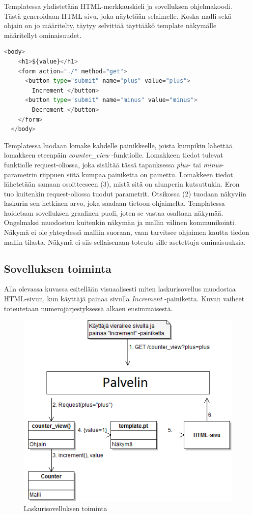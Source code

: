 \documentclass[finnish,utf8,nonumbib,palatino,kandi]{gradu2}
\begin{document}
Templatessa yhdistetään HTML-merkkauskieli ja sovelluksen ohjelmakoodi. Tästä generoidaan HTML-sivu, joka näytetään selaimelle. Koska malli sekä ohjain on jo määritelty, täytyy selvittää täyttääkö template näkymälle määritellyt ominaisuudet.
\begin{lstlisting}[language=Python]
  <body>
    <h1>${value}</h1>
    <form action="./" method="get">
      <button type="submit" name="plus" value="plus">
		Increment </button>
      <button type="submit" name="minus" value="minus"> 
		Decrement </button>
    </form>
  </body>
\end{lstlisting}
Templatessa luodaan lomake kahdelle painikkeelle, joista kumpikin lähettää lomakkeen eteenpäin \emph{counter\_view} -funktiolle. Lomakkeen tiedot tulevat funktiolle request-oliossa, joka sisältää tässä tapauksessa \emph{plus}- tai \emph{minus}-parametrin riippuen siitä kumpaa painiketta on painettu. Lomakkeen tiedot lähetetään samaan osoitteeseen (3), mistä sitä on alunperin kutsuttukin. Eron tuo kuitenkin request-oliossa tuodut parametrit.  Otsikossa (2) tuodaan näkyviin laskurin sen hetkinen arvo, joka saadaan tietoon ohjaimelta.
 Templatessa hoidetaan sovelluksen graafinen puoli, joten se vastaa osaltaan näkymää. \\ Ongelmaksi muodostuu kuitenkin näkymän ja mallin välinen kommunikointi. Näkymä ei ole yhteydessä malliin suoraan, vaan tarvitsee ohjaimen kautta tiedon mallin tilasta.  Näkymä ei siis sellaisenaan toteuta sille asetettuja ominaisuuksia. \\

\subsection{Sovelluksen toiminta}
Alla olevassa kuvassa esitellään visuaalisesti miten laskurisovellus muodostaa HTML-sivun, kun käyttäjä painaa sivulla \emph{Increment} -painiketta. Kuvan
vaiheet toteutetaan numerojärjestyksessä alkaen ensimmäisestä.
\begin{figure}[h]
\centering
\includegraphics[scale=0.87]{laskurisovellus.png}
\caption{Laskurisovelluksen toiminta}
\end{figure}
\end{document}
